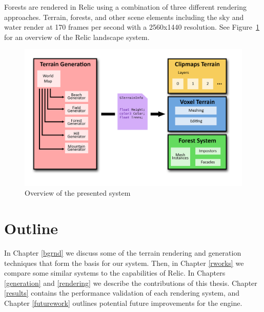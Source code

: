 Forests are rendered in Relic using a combination of three different rendering approaches.
Terrain, forests, and other scene elements including the sky and water render at 170 frames per second with a 2560x1440 resolution.
See Figure~\ref{fig:system1} for an overview of the Relic landscape system.

\begin{figure}
  \centering
    \includegraphics[width=1.0\textwidth]{figures/SystemDiagram.png}
  \caption{Overview of the presented system}
  \label{fig:system1}
\end{figure}


\section{Outline}

In Chapter \ref{bgrnd} we discuss some of the terrain rendering and generation techniques that form the basis for our system.
Then, in Chapter \ref{rworks} we compare some similar systems to the capabilities of Relic.
In Chapters \ref{generation} and \ref{rendering} we describe the contributions of this thesis.
Chapter \ref{results} contains the performance validation of each rendering system, and Chapter \ref{futurework} outlines potential future improvements for the engine.
